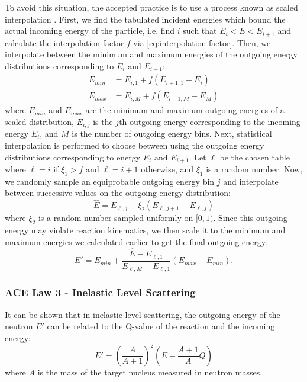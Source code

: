 To avoid this situation, the accepted practice is to use a process known as
scaled interpolation \cite{nse-doyas-1972}. First, we find the tabulated
incident energies which bound the actual incoming energy of the particle,
i.e. find $i$ such that $E_i < E < E_{i+1}$ and calculate the interpolation
factor $f$ via \eqref{eq:interpolation-factor}. Then, we interpolate between the
minimum and maximum energies of the outgoing energy distributions corresponding
to $E_i$ and $E_{i+1}$:
\begin{equation}
  \label{eq:ace-law-1-minmax}
  \begin{split}
    E_{min} &= E_{i,1} + f ( E_{i+1,1} - E_i ) \\
    E_{max} &= E_{i,M} + f ( E_{i+1,M} - E_M )
  \end{split}
\end{equation}
where $E_{min}$ and $E_{max}$ are the minimum and maximum outgoing energies of a
scaled distribution, $E_{i,j}$ is the $j$th outgoing energy corresponding to the
incoming energy $E_i$, and $M$ is the number of outgoing energy bins. Next,
statistical interpolation is performed to choose between using the outgoing
energy distributions corresponding to energy $E_i$ and $E_{i+1}$. Let $\ell$ be
the chosen table where $\ell = i$ if $\xi_1 > f$ and $\ell = i + 1$ otherwise,
and $\xi_1$ is a random number. Now, we randomly sample an equiprobable outgoing
energy bin $j$ and interpolate between successive values on the outgoing energy
distribution:
\begin{equation}
  \label{eq:ace-law-1-intermediate}
  \hat{E} = E_{\ell,j} + \xi_2 (E_{\ell,j+1} - E_{\ell,j})
\end{equation}
where $\xi_2$ is a random number sampled uniformly on $[0,1)$. Since
this outgoing energy may violate reaction kinematics, we then scale it to the
minimum and maximum energies we calculated earlier to get the final outgoing
energy:
\begin{equation}
  \label{eq:ace-law-1-energy}
  E' = E_{min} + \frac{\hat{E} - E_{\ell,1}}{E_{\ell,M} - E_{\ell,1}}
  (E_{max} - E_{min}).
\end{equation}

\subsubsection{ACE Law 3 - Inelastic Level Scattering}

It can be shown \cite{foderaro-1971} that in inelastic level scattering, the
outgoing energy of the neutron $E'$ can be related to the Q-value of the
reaction and the incoming energy:
\begin{equation}
  \label{eq:level-scattering}
  E' = \left ( \frac{A}{A+1} \right )^2 \left ( E - \frac{A + 1}{A} Q \right )
\end{equation}
where $A$ is the mass of the target nucleus measured in neutron masses.

